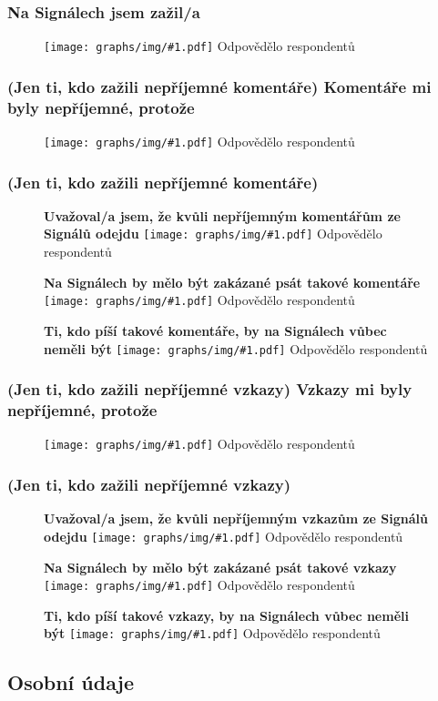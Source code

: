 \documentclass[12pt, a4paper, twoside]{article}
\newcommand{\answercount}[1]{Odpovědělo  respondentů}
\newcommand{\includegraph}[2]{
  \begin{figure}[H]
    \centering
    \textbf{#2}
    \texttt{[image: graphs/img/\#1.pdf]}
    \answercount{#1}
  \end{figure}
}
\begin{document}
\subsubsection{Na Signálech jsem zažil/a}

\includegraph{neprijemne_co}{}

\subsubsection{(Jen ti, kdo zažili nepříjemné komentáře) Komentáře mi byly nepříjemné, protože}

\includegraph{neprijemne_komentare_protoze}{}

\subsubsection{(Jen ti, kdo zažili nepříjemné komentáře)}

\includegraph{neprijemne_komentare_zvazoval_odchod}{Uvažoval/a jsem, že kvůli nepříjemným komentářům ze Signálů odejdu}

\includegraph{neprijemne_komentare_zakazat}{Na Signálech by mělo být zakázané psát takové komentáře}

\includegraph{neprijemne_komentare_pisatele_pryc}{Ti, kdo píší takové komentáře, by na Signálech vůbec neměli být}

\subsubsection{(Jen ti, kdo zažili nepříjemné vzkazy) Vzkazy mi byly nepříjemné, protože}

\includegraph{neprijemne_vzkazy_protoze}{}

\subsubsection{(Jen ti, kdo zažili nepříjemné vzkazy)}

\includegraph{neprijemne_vzkazy_zvazoval_odchod}{Uvažoval/a jsem, že kvůli nepříjemným vzkazům ze Signálů odejdu}

\includegraph{neprijemne_vzkazy_zakazat}{Na Signálech by mělo být zakázané psát takové vzkazy}

\includegraph{neprijemne_vzkazy_pisatele_pryc}{Ti, kdo píší takové vzkazy, by na Signálech vůbec neměli být}

\subsection{Osobní údaje}\label{sec:osobni}
\end{document}
